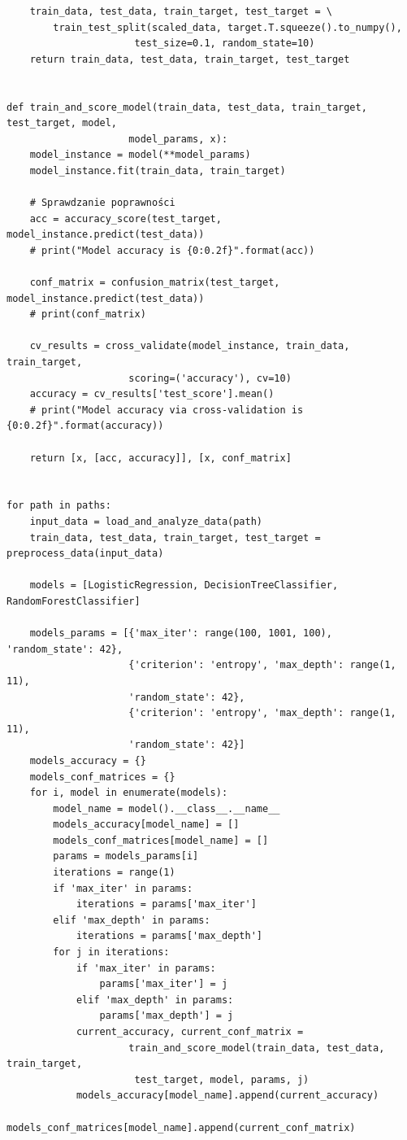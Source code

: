 \documentclass[11pt, a4paper, notitlepage]{report}
\begin{document}
\begin{appendices}
\begin{verbatim}
    train_data, test_data, train_target, test_target = \
        train_test_split(scaled_data, target.T.squeeze().to_numpy(),
                      test_size=0.1, random_state=10)
    return train_data, test_data, train_target, test_target


def train_and_score_model(train_data, test_data, train_target, test_target, model, 
                     model_params, x):
    model_instance = model(**model_params)
    model_instance.fit(train_data, train_target)

    # Sprawdzanie poprawności
    acc = accuracy_score(test_target, model_instance.predict(test_data))
    # print("Model accuracy is {0:0.2f}".format(acc))

    conf_matrix = confusion_matrix(test_target, model_instance.predict(test_data))
    # print(conf_matrix)

    cv_results = cross_validate(model_instance, train_data, train_target, 
                     scoring=('accuracy'), cv=10)
    accuracy = cv_results['test_score'].mean()
    # print("Model accuracy via cross-validation is {0:0.2f}".format(accuracy))

    return [x, [acc, accuracy]], [x, conf_matrix]


for path in paths:
    input_data = load_and_analyze_data(path)
    train_data, test_data, train_target, test_target = preprocess_data(input_data)

    models = [LogisticRegression, DecisionTreeClassifier, RandomForestClassifier]

    models_params = [{'max_iter': range(100, 1001, 100), 'random_state': 42},
                     {'criterion': 'entropy', 'max_depth': range(1, 11), 
                     'random_state': 42},
                     {'criterion': 'entropy', 'max_depth': range(1, 11), 
                     'random_state': 42}]
    models_accuracy = {}
    models_conf_matrices = {}
    for i, model in enumerate(models):
        model_name = model().__class__.__name__
        models_accuracy[model_name] = []
        models_conf_matrices[model_name] = []
        params = models_params[i]
        iterations = range(1)
        if 'max_iter' in params:
            iterations = params['max_iter']
        elif 'max_depth' in params:
            iterations = params['max_depth']
        for j in iterations:
            if 'max_iter' in params:
                params['max_iter'] = j
            elif 'max_depth' in params:
                params['max_depth'] = j
            current_accuracy, current_conf_matrix = 
                     train_and_score_model(train_data, test_data, train_target,
                      test_target, model, params, j)
            models_accuracy[model_name].append(current_accuracy)
            models_conf_matrices[model_name].append(current_conf_matrix)


\end{verbatim}
\end{appendices}
\end{document}
